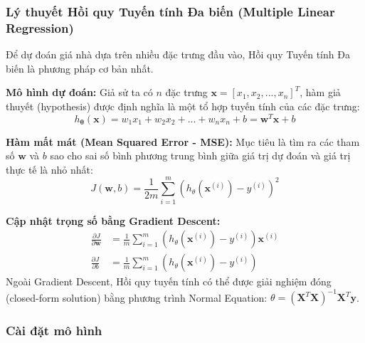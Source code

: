 \documentclass[12pt,a4paper]{article}
\begin{document}
\subsubsection{Lý thuyết Hồi quy Tuyến tính Đa biến (Multiple Linear Regression)}
Để dự đoán giá nhà dựa trên nhiều đặc trưng đầu vào, Hồi quy Tuyến tính Đa biến là phương pháp cơ bản nhất. 

\textbf{Mô hình dự đoán:}
Giả sử ta có $n$ đặc trưng $\mathbf{x} = [x_1, x_2, ..., x_n]^T$, hàm giả thuyết (hypothesis) được định nghĩa là một tổ hợp tuyến tính của các đặc trưng:
\begin{equation}
h_{\mathbf{\theta}}(\mathbf{x}) = w_1 x_1 + w_2 x_2 + ... + w_n x_n + b = \mathbf{w}^T\mathbf{x} + b
\end{equation}

\textbf{Hàm mất mát (Mean Squared Error - MSE):}
Mục tiêu là tìm ra các tham số $\mathbf{w}$ và $b$ sao cho sai số bình phương trung bình giữa giá trị dự đoán và giá trị thực tế là nhỏ nhất:
\begin{equation}
J(\mathbf{w}, b) = \frac{1}{2m} \sum_{i=1}^{m} \left( h_{\theta}(\mathbf{x}^{(i)}) - y^{(i)} \right)^2
\end{equation}

\textbf{Cập nhật trọng số bằng Gradient Descent:}
\begin{align}
\frac{\partial J}{\partial \mathbf{w}} &= \frac{1}{m} \sum_{i=1}^{m} \left( h_{\theta}(\mathbf{x}^{(i)}) - y^{(i)} \right) \mathbf{x}^{(i)} \\
\frac{\partial J}{\partial b} &= \frac{1}{m} \sum_{i=1}^{m} \left( h_{\theta}(\mathbf{x}^{(i)}) - y^{(i)} \right)
\end{align}
Ngoài Gradient Descent, Hồi quy tuyến tính có thể được giải nghiệm đóng (closed-form solution) bằng phương trình Normal Equation: $\theta = (\mathbf{X}^T\mathbf{X})^{-1}\mathbf{X}^T\mathbf{y}$.

\newpage
\subsubsection{Cài đặt mô hình}
\end{document}
